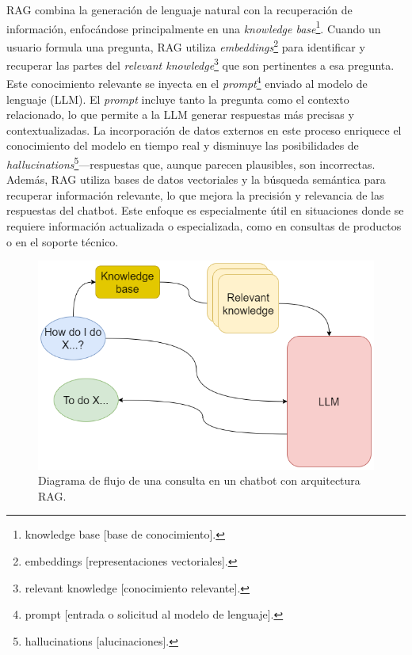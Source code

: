   RAG combina la generación de lenguaje natural con la recuperación de información, enfocándose principalmente en una \textit{knowledge base}\footnote{knowledge base [base de conocimiento].}. Cuando un usuario formula una pregunta, RAG utiliza \textit{embeddings}\footnote{embeddings [representaciones vectoriales].} para identificar y recuperar las partes del \textit{relevant knowledge}\footnote{relevant knowledge [conocimiento relevante].} que son pertinentes a esa pregunta.
  Este conocimiento relevante se inyecta en el \textit{prompt}\footnote{prompt [entrada o solicitud al modelo de lenguaje].} enviado al modelo de lenguaje (LLM). El \textit{prompt} incluye tanto la pregunta como el contexto relacionado, lo que permite a la LLM generar respuestas más precisas y contextualizadas. La incorporación de datos externos en este proceso enriquece el conocimiento del modelo en tiempo real y disminuye las posibilidades de \textit{hallucinations}\footnote{hallucinations [alucinaciones].}—respuestas que, aunque parecen plausibles, son incorrectas.
  Además, RAG utiliza bases de datos vectoriales y la búsqueda semántica para recuperar información relevante, lo que mejora la precisión y relevancia de las respuestas del chatbot. Este enfoque es especialmente útil en situaciones donde se requiere información actualizada o especializada, como en consultas de productos o en el soporte técnico.

 \begin{figure}[htbp] 
	\centering
	\includegraphics[width=.75\textwidth]{./Figures/RAG.png}
	\caption{Diagrama de flujo de una consulta en un chatbot con arquitectura RAG.}
	\label{fig:arquitectura_rag}
\end{figure}

  \newpage
  
